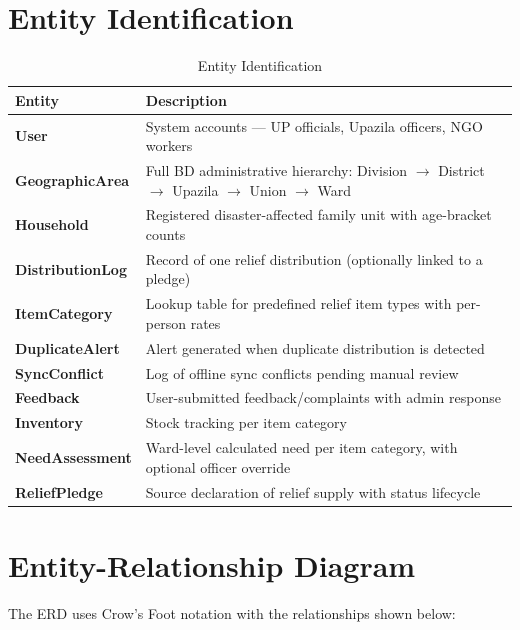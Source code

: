 
\section{Entity Identification}
\begin{table}[H]
\centering
\caption{Entity Identification}
\label{tab:entities}
\begin{tabularx}{\textwidth}{@{}lX@{}}
\toprule
Entity & Description \\
\midrule
\textbf{User} & System accounts --- UP officials, Upazila officers, NGO workers \\
\textbf{GeographicArea} & Full BD administrative hierarchy: Division $\rightarrow$ District $\rightarrow$ Upazila $\rightarrow$ Union $\rightarrow$ Ward \\
\textbf{Household} & Registered disaster-affected family unit with age-bracket counts \\
\textbf{DistributionLog} & Record of one relief distribution (optionally linked to a pledge) \\
\textbf{ItemCategory} & Lookup table for predefined relief item types with per-person rates \\
\textbf{DuplicateAlert} & Alert generated when duplicate distribution is detected \\
\textbf{SyncConflict} & Log of offline sync conflicts pending manual review \\
\textbf{Feedback} & User-submitted feedback/complaints with admin response \\
\textbf{Inventory} & Stock tracking per item category \\
\textbf{NeedAssessment} & Ward-level calculated need per item category, with optional officer override \\
\textbf{ReliefPledge} & Source declaration of relief supply with status lifecycle \\
\bottomrule
\end{tabularx}
\end{table}

\section{Entity-Relationship Diagram}
The ERD uses Crow's Foot notation with the relationships shown below:

